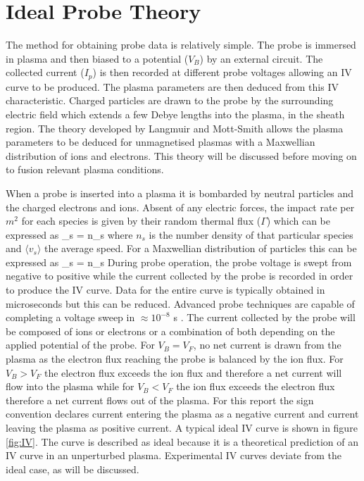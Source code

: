 \section{Ideal Probe Theory}     \label{Section:Ideal}
The method for obtaining probe data is relatively simple. The probe is immersed in plasma and then biased to a potential ($V_B$) by an external circuit. The collected current ($I_p$) is then recorded at different probe voltages allowing an IV curve to be produced. The plasma parameters are then deduced from this IV characteristic. Charged particles are drawn to the probe by the surrounding electric field which extends a few Debye lengths into the plasma, in the sheath region. The theory developed by Langmuir and Mott-Smith allows the plasma parameters to be deduced for unmagnetised plasmas with a Maxwellian distribution of ions and electrons. This theory will be discussed before moving on to fusion relevant plasma conditions. 


When a probe is inserted into a plasma it is bombarded by neutral particles and the charged electrons and ions. Absent of any electric forces, the impact rate per $m^2$ for each species is given by their random thermal flux ($\Gamma$) which can be expressed as 
\be 
\Gamma_s =  n_s \rangle 
\label{eq:thermalmotion}
\ee
where $n_s$ is the number density of that particular species and $\langle{v_s}\rangle$ the average speed. For a Maxwellian distribution of particles this can be expressed as 
\be 
\Gamma_s =   n_s 
\ee
During probe operation, the probe voltage is swept from negative to positive while the current collected by the probe is recorded in order to produce the IV curve. Data for the entire curve is typically obtained in microseconds but this can be reduced. Advanced probe techniques are capable of completing a voltage sweep in $\approx 10^{-8}$ s \cite{time-res}. The current collected by the probe will be composed of ions or electrons or a combination of both depending on the applied potential of the probe. For $V_B = V_F$, no net current is drawn from the plasma as the electron flux reaching the probe is balanced by the ion flux. For $V_B > V_F$ the electron flux exceeds the ion flux and therefore a net current will flow into the plasma while for $V_B <V_F$ the ion flux exceeds the electron flux therefore a net current flows out of the plasma. For this report the sign convention declares current entering the plasma as a negative current and current leaving the plasma as positive current. A typical ideal IV curve is shown in figure \ref{fig:IV}. The curve is described as ideal because it is a theoretical prediction of an IV curve in an unperturbed plasma. Experimental IV curves deviate from the ideal case, as will be discussed.

